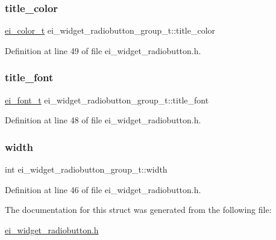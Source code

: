 \subsubsection{\texorpdfstring{title\+\_\+color}{title\_color}}
{\footnotesize\ttfamily \hyperlink{structei__color__t}{ei\+\_\+color\+\_\+t} ei\+\_\+widget\+\_\+radiobutton\+\_\+group\+\_\+t\+::title\+\_\+color}



Definition at line 49 of file ei\+\_\+widget\+\_\+radiobutton.\+h.

\mbox{\label{structei__widget__radiobutton__group__t_ac914d35e11bbc7cef1152f35457f4a0f}} 
\subsubsection{\texorpdfstring{title\+\_\+font}{title\_font}}
{\footnotesize\ttfamily \hyperlink{ei__types_8h_a22c8198e4d641e4bc67bb17f9c6bcda7}{ei\+\_\+font\+\_\+t} ei\+\_\+widget\+\_\+radiobutton\+\_\+group\+\_\+t\+::title\+\_\+font}



Definition at line 48 of file ei\+\_\+widget\+\_\+radiobutton.\+h.

\mbox{\label{structei__widget__radiobutton__group__t_af7a2df06a7d11d5c4025dc2a44b684ed}} 
\subsubsection{\texorpdfstring{width}{width}}
{\footnotesize\ttfamily int ei\+\_\+widget\+\_\+radiobutton\+\_\+group\+\_\+t\+::width}



Definition at line 46 of file ei\+\_\+widget\+\_\+radiobutton.\+h.



The documentation for this struct was generated from the following file\+:\begin{DoxyCompactItemize}
\item 
\hyperlink{ei__widget__radiobutton_8h}{ei\+\_\+widget\+\_\+radiobutton.\+h}\end{DoxyCompactItemize}
